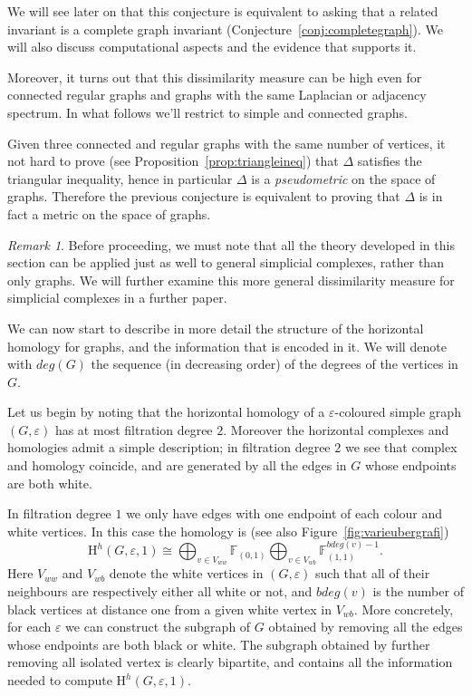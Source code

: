 \documentclass[11pt, a4paper, reqno, twoside, makeidx]{amsart}
\theoremstyle{remark}
\newtheorem{rmk}{Remark}[section]
\theoremstyle{plain}
\theoremstyle{definition}
\newcommand{\F}{\mathbb{F}}
\newcommand{\HH}{\mathrm{H}}
\begin{document}
We will see later on that this conjecture is equivalent to asking that a related invariant is a complete graph invariant (Conjecture~\ref{conj:completegraph}). We will also discuss computational aspects and the evidence that  supports it.  


Moreover, it turns out that this dissimilarity measure can be high even for connected regular graphs and graphs with the same Laplacian or adjacency spectrum. In what follows we'll restrict to simple and connected graphs.


Given three connected and regular graphs with the same number of vertices, it not hard to prove (see Proposition~\ref{prop:triangleineq}) that $\Delta$ satisfies the triangular inequality, hence in particular $\Delta$ is a \emph{pseudometric} on the space of graphs. Therefore the previous conjecture is equivalent to proving that $\Delta$ is in fact a metric on the space of graphs.

\begin{rmk}
Before proceeding, we must note that all the theory developed in this section can be applied just as well to general simplicial complexes, rather than only graphs. We will further examine this more general dissimilarity measure for simplicial complexes in a further paper.
\end{rmk}

We can now start to describe in more detail the structure of the horizontal homology for graphs, and the information that is encoded in it. We will denote with $deg(G)$ the sequence (in decreasing order) of the degrees of the vertices in $G$.

Let us begin by noting that the horizontal homology of a $\varepsilon$-coloured simple graph $(G, \varepsilon)$ has at most filtration degree $2$. Moreover the horizontal complexes and homologies admit a simple description; in filtration degree $2$ we see that complex and homology coincide, and are generated by all the edges in $G$ whose endpoints are both white. 

In filtration degree $1$ we only have edges with one endpoint of each colour and white vertices. In this case the homology is (see also Figure~\ref{fig:varieubergrafi})
\begin{equation}\label{eqn:horgraph}
\HH^h(G, \varepsilon, 1) \cong \bigoplus_{v \in V_{ww}} \F_{(0,1)}  \bigoplus_{v \in V_{wb}} \F^{bdeg(v)-1}_{(1,1)}.
\end{equation}
Here $V_{ww}$ and $V_{wb}$ denote the white vertices in $(G, \varepsilon)$ such that all of their neighbours are respectively either all white or not, and $bdeg(v)$ is the number of black vertices at distance one from a given white vertex in $V_{wb}$. More concretely, for each $\varepsilon$ we can construct the subgraph of $G$ obtained by removing all the edges whose endpoints are both black or white. The subgraph obtained by further removing all isolated vertex is clearly bipartite, and contains all the information needed to compute $\HH^h(G,\varepsilon,1)$.
\end{document}
